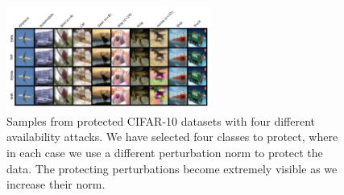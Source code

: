 \documentclass[conference]{IEEEtran}
\theoremstyle{definition}
\theoremstyle{remark}
\theoremstyle{proposition}
\begin{document}
\begin{figure}[htp!]
    \centering
    \includegraphics[width=0.6\textwidth]{combination_attacks/combination_attacks_samples.png}
    \caption{Samples from protected CIFAR-10 datasets with four different availability attacks. We have selected four classes to protect, where in each case we use a different perturbation norm to protect the data.
    The protecting perturbations become extremely visible as we increase their norm.}
    \label{fig:combination_attacks_samples}
    \vspace{-2em}
\end{figure}
\end{document}
